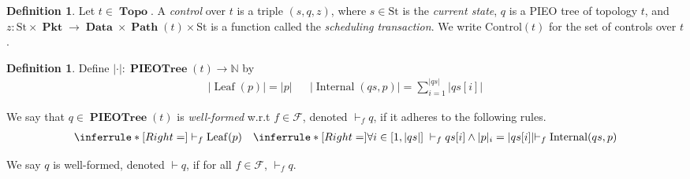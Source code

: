 \documentclass{amsart}
\newcommand{\inference}[3]{\inferrule*[Right=#1]{#2}{#3}}
\newcommand{\axiom}[2]{\inferrule*[Right=#1]{\;}{#2}}
\DeclareMathOperator{\Pkt}{\mathbf{Pkt}}
\DeclareMathOperator{\Data}{\mathbf{Data}}
\DeclareMathOperator{\Topo}{\mathbf{Topo}}
\DeclareMathOperator{\Path}{\mathbf{Path}}
\DeclareMathOperator{\PIEOTree}{\mathbf{PIEOTree}}
\DeclareMathOperator{\Leaf}{\mathrm{Leaf}}
\DeclareMathOperator{\Internal}{\mathrm{Internal}}
\theoremstyle{definition}
\newtheorem{dfn}[thm]{Definition}
\begin{document}
\begin{dfn}
    Let $t \in \Topo$. 
    A \emph{control} over $t$ is a triple $(s, q, z)$, where $s \in \mathrm{St}$ is the \emph{current state},
    $q$ is a PIEO tree of topology $t$, 
    and $z : \mathrm{St} \times \Pkt \to \Data \times \Path(t) \times \mathrm{St}$ is a function called the \emph{scheduling transaction}.
    We write $\mathrm{Control}(t)$ for the set of controls over $t$.
\end{dfn}

\begin{dfn}
    Define $|\cdot| : \PIEOTree(t) \to \mathbb N$ by
    \begin{align*}
        |\Leaf(p)| = |p| && |\Internal(qs, p)| = \sum_{i=1}^{|qs|} |qs[i]|
    \end{align*}

    We say that $q \in \PIEOTree(t)$ is \emph{well-formed} w.r.t $f \in \mathcal F$, denoted $\vdash_f q$, if it adheres to the following rules.
    \begin{align*}
        \axiom{}
        {\vdash_f \Leaf(p)}
        &&
        \inference{}
        {
            \forall i \in [1, |qs|] \; \vdash_f qs[i] \land |p|_i = |qs[i]|
        }
        {
            \vdash_f \Internal(qs, p)
        }
    \end{align*}

    We say $q$ is well-formed, denoted $\vdash q$, if for all $f \in \mathcal F$, $\vdash_f q$.
\end{dfn}

\newpage 


\renewcommand\refname{\LARGE References}
 

\end{document}
